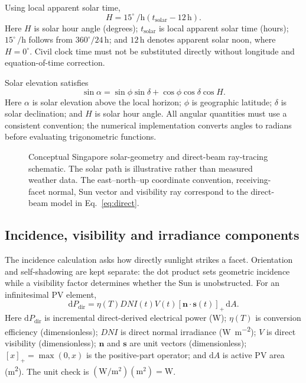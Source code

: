 \documentclass[11pt,a4paper]{article}
\begin{document}
Using local apparent solar time,
\begin{equation}
H=15^{\circ}\,\si{\per\hour}\left(t_{\mathrm{solar}}-12\,\si{\hour}\right).
\label{eq:hour-angle}
\end{equation}
Here $H$ is solar hour angle (degrees); $t_{\mathrm{solar}}$ is local apparent solar time (hours); $15^{\circ}\,\si{\per\hour}$ follows from $360^{\circ}/24\,\si{\hour}$; and $12\,\si{\hour}$ denotes apparent solar noon, where $H=0^{\circ}$. Civil clock time must not be substituted directly without longitude and equation-of-time correction.

Solar elevation satisfies
\begin{equation}
\sin\alpha=\sin\phi\sin\delta+\cos\phi\cos\delta\cos H.
\label{eq:elevation}
\end{equation}
Here $\alpha$ is solar elevation above the local horizon; $\phi$ is geographic latitude; $\delta$ is solar declination; and $H$ is solar hour angle. All angular quantities must use a consistent convention; the numerical implementation converts angles to radians before evaluating trigonometric functions.

\begin{figure}[htbp]
\centering

\caption{Conceptual Singapore solar-geometry and direct-beam ray-tracing schematic. The solar path is illustrative rather than measured weather data. The east--north--up coordinate convention, receiving-facet normal, Sun vector and visibility ray correspond to the direct-beam model in Eq.~\eqref{eq:direct}.}
\label{fig:solar-ray}
\end{figure}

\subsection{Incidence, visibility and irradiance components}
The incidence calculation asks how directly sunlight strikes a facet. Orientation and self-shadowing are kept separate: the dot product sets geometric incidence while a visibility factor determines whether the Sun is unobstructed.
For an infinitesimal PV element,
\begin{equation}
\mathrm dP_{\mathrm{dir}}=\eta(T)DNI(t)V(t)[\mathbf n\cdot\mathbf s(t)]_{+}\,\mathrm dA.
\label{eq:direct}
\end{equation}
Here $\mathrm dP_{\mathrm{dir}}$ is incremental direct-derived electrical power (W); $\eta(T)$ is conversion efficiency (dimensionless); $DNI$ is direct normal irradiance (\si{\watt\per\square\metre}); $V$ is direct visibility (dimensionless); $\mathbf n$ and $\mathbf s$ are unit vectors (dimensionless); $[x]_+=\max(0,x)$ is the positive-part operator; and $\mathrm dA$ is active PV area (\si{\square\metre}). The unit check is $(\si{\watt\per\square\metre})(\si{\square\metre})=\si{\watt}$.
\end{document}

